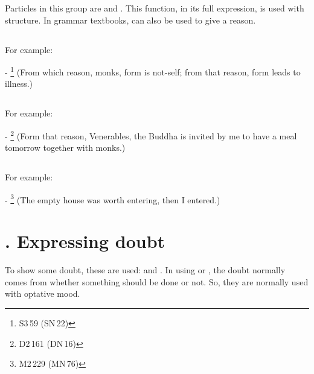 Particles in this group are  and . This function, in its full expression, is used with  structure. In grammar textbooks,  can also be used to give a reason.

\subsection*{}\label{nip:yasmaa}\label{nip:tasmaa}
For example:\par
- \footnote{S3\,59 (SN\,22)} (From which reason, monks, form is not-self; from that reason, form leads to illness.) \par

\subsection*{}\label{nip:tathaahi}
For example:\par
- \footnote{D2\,161 (DN\,16)} (Form that reason, Venerables, the Buddha is invited by me to have a meal tomorrow together with monks.) \par

\subsection*{}\label{nip:tena}
For example:\par
- \footnote{M2\,229 (MN\,76)} (The empty house was worth entering, then I entered.) \par

\label{nipgrp6}
\section*{. Expressing doubt}

To show some doubt, these are used:  and . In using  or , the doubt normally comes from whether something should be done or not. So, they are normally used with optative mood.

